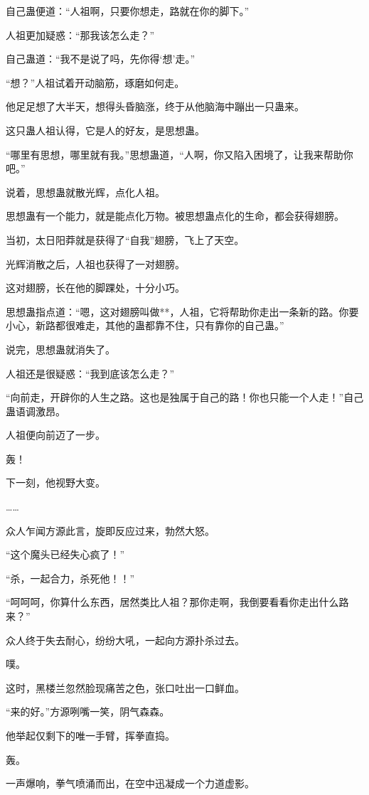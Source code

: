 \begin{this_body}
自己蛊便道：“人祖啊，只要你想走，路就在你的脚下。”

人祖更加疑惑：“那我该怎么走？”

自己蛊道：“我不是说了吗，先你得‘想’走。”

“想？”人祖试着开动脑筋，琢磨如何走。

他足足想了大半天，想得头昏脑涨，终于从他脑海中蹦出一只蛊来。

这只蛊人祖认得，它是人的好友，是思想蛊。

“哪里有思想，哪里就有我。”思想蛊道，“人啊，你又陷入困境了，让我来帮助你吧。”

说着，思想蛊就散光辉，点化人祖。

思想蛊有一个能力，就是能点化万物。被思想蛊点化的生命，都会获得翅膀。

当初，太日阳莽就是获得了“自我”翅膀，飞上了天空。

光辉消散之后，人祖也获得了一对翅膀。

这对翅膀，长在他的脚踝处，十分小巧。

思想蛊指点道：“嗯，这对翅膀叫做**，人祖，它将帮助你走出一条新的路。你要小心，新路都很难走，其他的蛊都靠不住，只有靠你的自己蛊。”

说完，思想蛊就消失了。

人祖还是很疑惑：“我到底该怎么走？”

“向前走，开辟你的人生之路。这也是独属于自己的路！你也只能一个人走！”自己蛊语调激昂。

人祖便向前迈了一步。

轰！

下一刻，他视野大变。

……

众人乍闻方源此言，旋即反应过来，勃然大怒。

“这个魔头已经失心疯了！”

“杀，一起合力，杀死他！！”

“呵呵呵，你算什么东西，居然类比人祖？那你走啊，我倒要看看你走出什么路来？”

众人终于失去耐心，纷纷大吼，一起向方源扑杀过去。

噗。

这时，黑楼兰忽然脸现痛苦之色，张口吐出一口鲜血。

“来的好。”方源咧嘴一笑，阴气森森。

他举起仅剩下的唯一手臂，挥拳直捣。

轰。

一声爆响，拳气喷涌而出，在空中迅凝成一个力道虚影。

\end{this_body}

